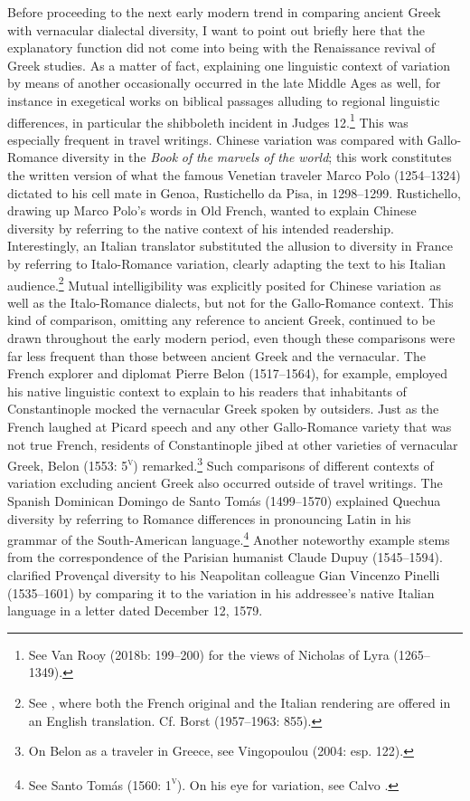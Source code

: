 \documentclass[output=paper]{langsci/langscibook}
\begin{document}
Before proceeding to the next early modern trend in comparing ancient Greek with vernacular dialectal diversity, I want to point out briefly here that the explanatory function did not come into being with the Renaissance revival of Greek studies. As a matter of fact, explaining one linguistic context of variation by means of another occasionally occurred in the late Middle Ages as well, for instance in exegetical works on biblical passages alluding to regional linguistic differences, in particular the shibboleth incident in Judges 12.\footnote{See Van Rooy (2018b: 199–200) for the views of Nicholas of Lyra (1265–1349).} This was especially frequent in travel writings. Chinese variation was compared with Gallo-Romance diversity in the \textit{Book} \textit{of} \textit{the} \textit{marvels} \textit{of} \textit{the} \textit{world}; this work constitutes the written version of what the famous Venetian traveler Marco Polo (1254–1324) dictated to his cell mate in Genoa, Rustichello da Pisa, in 1298–1299. Rustichello, drawing up Marco Polo’s words in Old French, wanted to explain Chinese diversity by referring to the native context of his intended readership. Interestingly, an Italian translator substituted the allusion to diversity in France by referring to Italo-Romance variation, clearly adapting the text to his Italian audience.\footnote{See \citet[157]{Polo1938}, where both the French original and the Italian rendering are offered in an English translation. Cf. Borst (1957–1963: 855).} Mutual intelligibility was explicitly posited for Chinese variation as well as the Italo-Romance dialects, but not for the Gallo-Romance context. This kind of comparison, omitting any reference to ancient Greek, continued to be drawn throughout the early modern period, even though these comparisons were far less frequent than those between ancient Greek and the vernacular. The French explorer and diplomat Pierre Belon (1517–1564), for example, employed his native linguistic context to explain to his readers that inhabitants of Constantinople mocked the vernacular Greek spoken by outsiders. Just as the French laughed at Picard speech and any other Gallo-Romance variety that was not true French, residents of Constantinople jibed at other varieties of vernacular Greek, Belon (1553: 5\textsc{\textsuperscript{v}}) remarked.\footnote{On Belon as a traveler in Greece, see Vingopoulou (2004: esp. 122).} Such comparisons of different contexts of variation excluding ancient Greek also occurred outside of travel writings. The Spanish Dominican Domingo de Santo Tomás (1499–1570) explained Quechua diversity by referring to Romance differences in pronouncing Latin in his grammar of the South-American language.\footnote{See Santo Tomás (1560: 1\textsc{\textsuperscript{v}}). On his eye for variation, see Calvo \citet[140]{Pérez2005}.} Another noteworthy example stems from the correspondence of the Parisian humanist Claude Dupuy (1545–1594). \citet[274]{Dupuy2001} clarified Provençal diversity to his Neapolitan colleague Gian Vincenzo Pinelli (1535–1601) by comparing it to the variation in his addressee’s native Italian language in a letter dated December 12, 1579.
\end{document}
